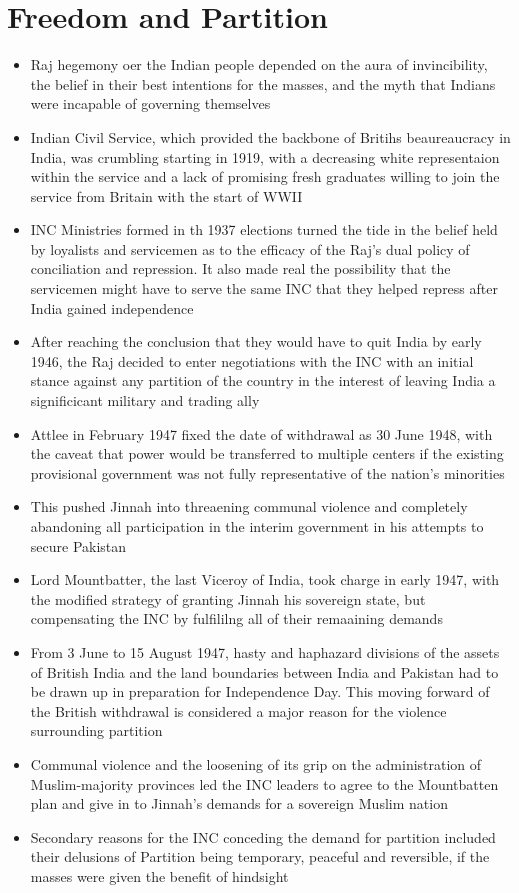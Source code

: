 \section{Freedom and Partition}
\begin{itemize}
    \item Raj hegemony oer the Indian people depended on the aura of invincibility, the belief in their best intentions for the masses, and the myth that Indians were incapable of governing themselves
    \item Indian Civil Service, which provided the backbone of Britihs beaureaucracy in India, was crumbling starting in 1919, with a decreasing white representaion within the service and a lack of promising fresh graduates willing to join the service from Britain with the start of WWII
    \item INC Ministries formed in th 1937 elections turned the tide in the belief held by loyalists and servicemen as to the efficacy of the Raj's dual policy of conciliation and repression. It also made real the possibility that the servicemen might have to serve the same INC that they helped repress after India gained independence
    \item After reaching the conclusion that they would have to quit India by early 1946, the Raj decided to enter negotiations with the INC with an initial stance against any partition of the country in the interest of leaving India a significicant military and trading ally
    \item Attlee in February 1947 fixed the date of withdrawal as 30 June 1948, with the caveat that power would be transferred to multiple centers if the existing provisional government was not fully representative of the nation's minorities
    \item This pushed Jinnah into threaening communal violence and completely abandoning all participation in the interim government in his attempts to secure Pakistan
    \item Lord Mountbatter, the last Viceroy of India, took charge in early 1947, with the modified strategy of granting Jinnah his sovereign state, but compensating the INC by fulfililng all of their remaaining demands
    \item From 3 June to 15 August 1947, hasty and haphazard divisions of the assets of British India and the land boundaries between India and Pakistan had to be drawn up in preparation for Independence Day. This moving forward of the British withdrawal is considered a major reason for the violence surrounding partition
    \item Communal violence and the loosening of its grip on the administration of Muslim-majority provinces led the INC leaders to agree to the Mountbatten plan and give in to Jinnah's demands for a sovereign Muslim nation
    \item Secondary reasons for the INC conceding the demand for partition included their delusions of Partition being temporary, peaceful and reversible, if the masses were given the benefit of hindsight
\end{itemize}

